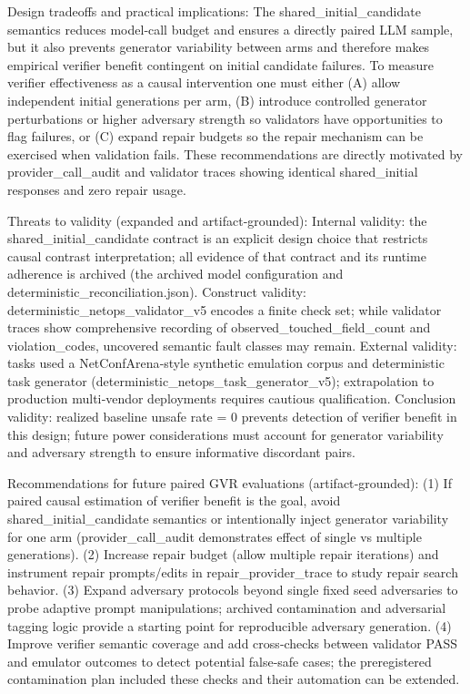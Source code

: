 \documentclass[conference]{IEEEtran}
\begin{document}
Design tradeoffs and practical implications: The shared\_initial\_candidate semantics reduces model‑call budget and ensures a directly paired LLM sample, but it also prevents generator variability between arms and therefore makes empirical verifier benefit contingent on initial candidate failures. To measure verifier effectiveness as a causal intervention one must either (A) allow independent initial generations per arm, (B) introduce controlled generator perturbations or higher adversary strength so validators have opportunities to flag failures, or (C) expand repair budgets so the repair mechanism can be exercised when validation fails. These recommendations are directly motivated by provider\_call\_audit and validator traces showing identical shared\_initial responses and zero repair usage.

Threats to validity (expanded and artifact‑grounded): Internal validity: the shared\_initial\_candidate contract is an explicit design choice that restricts causal contrast interpretation; all evidence of that contract and its runtime adherence is archived (the archived model configuration and deterministic\_reconciliation.json). Construct validity: deterministic\_netops\_validator\_v5 encodes a finite check set; while validator traces show comprehensive recording of observed\_touched\_field\_count and violation\_codes, uncovered semantic fault classes may remain. External validity: tasks used a NetConfArena‑style synthetic emulation corpus and deterministic task generator (deterministic\_netops\_task\_generator\_v5); extrapolation to production multi‑vendor deployments requires cautious qualification. Conclusion validity: realized baseline unsafe rate = 0 prevents detection of verifier benefit in this design; future power considerations must account for generator variability and adversary strength to ensure informative discordant pairs.

Recommendations for future paired GVR evaluations (artifact‑grounded): (1) If paired causal estimation of verifier benefit is the goal, avoid shared\_initial\_candidate semantics or intentionally inject generator variability for one arm (provider\_call\_audit demonstrates effect of single vs multiple generations). (2) Increase repair budget (allow multiple repair iterations) and instrument repair prompts/edits in repair\_provider\_trace to study repair search behavior. (3) Expand adversary protocols beyond single fixed seed adversaries to probe adaptive prompt manipulations; archived contamination and adversarial tagging logic provide a starting point for reproducible adversary generation. (4) Improve verifier semantic coverage and add cross‑checks between validator PASS and emulator outcomes to detect potential false‑safe cases; the preregistered contamination plan included these checks and their automation can be extended.
\end{document}

